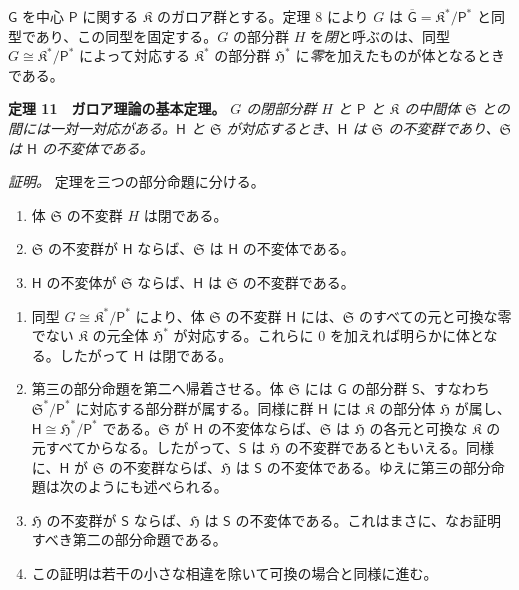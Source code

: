 $\mathsf{G}$ を中心 $\mathsf P$ に関する $\mathfrak K$ のガロア群とする。定理 8 により $G$ は $\overline{\mathsf G}=\mathfrak K^*/\mathsf P^*$ と同型であり、この同型を固定する。$G$ の部分群 $H$ を\emph{閉}と呼ぶのは、同型 $G\cong\mathfrak K^*/\mathsf P^*$ によって対応する $\mathfrak K^*$ の部分群 $\mathfrak H^*$ に\emph{零}を加えたものが体となるときである。

\textbf{定理 11　ガロア理論の基本定理。} \emph{$G$ の閉部分群 $H$ と $\mathsf P$ と $\mathfrak K$ の中間体 $\mathfrak S$ との間には一対一対応がある。$\mathsf{H}$ と $\mathfrak S$ が対応するとき、$\mathsf{H}$ は $\mathfrak S$ の不変群であり、$\mathfrak S$ は $\mathsf{H}$ の不変体である。}

\emph{証明。} 定理を三つの部分命題に分ける。
\begin{enumerate}
\item 体 $\mathfrak S$ の不変群 $H$ は閉である。
\item $\mathfrak S$ の不変群が $\mathsf{H}$ ならば、$\mathfrak S$ は $\mathsf{H}$ の不変体である。
\item $\mathsf{H}$ の不変体が $\mathfrak S$ ならば、$\mathsf{H}$ は $\mathfrak S$ の不変群である。
\end{enumerate}

\begin{enumerate}
\item 同型 $G\cong \mathfrak K^*/\mathsf P^*$ により、体 $\mathfrak S$ の不変群 $\mathsf{H}$ には、$\mathfrak S$ のすべての元と可換な零でない $\mathfrak K$ の元全体 $\mathfrak H^*$ が対応する。これらに $0$ を加えれば明らかに体となる。したがって $\mathsf{H}$ は閉である。

\item 第三の部分命題を第二へ帰着させる。体 $\mathfrak S$ には $\mathsf{G}$ の部分群 $\mathsf{S}$、すなわち $\mathfrak S^*/\mathsf P^*$ に対応する部分群が属する。同様に群 $\mathsf{H}$ には $\mathfrak K$ の部分体 $\mathfrak H$ が属し、$\mathsf{H}\cong \mathfrak H^*/\mathsf P^*$ である。$\mathfrak S$ が $\mathsf{H}$ の不変体ならば、$\mathfrak S$ は $\mathfrak H$ の各元と可換な $\mathfrak K$ の元すべてからなる。したがって、$\mathsf{S}$ は $\mathfrak H$ の不変群であるともいえる。同様に、$\mathsf{H}$ が $\mathfrak S$ の不変群ならば、$\mathfrak H$ は $\mathsf{S}$ の不変体である。ゆえに第三の部分命題は次のようにも述べられる。

\item[$3'$.] $\mathfrak H$ の不変群が $\mathsf{S}$ ならば、$\mathfrak H$ は $\mathsf{S}$ の不変体である。これはまさに、なお証明すべき第二の部分命題である。

\item[3.] この証明は若干の小さな相違を除いて可換の場合と同様に進む。
\end{enumerate}

